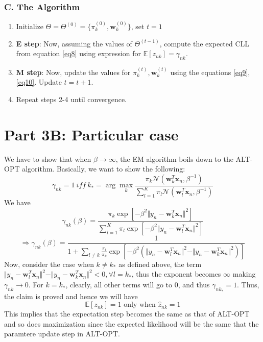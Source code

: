\documentclass[a4paper,11pt]{article}
\begin{document}
\begin{mlsolution}
\subsubsection{C. The Algorithm}
\begin{enumerate}
	\item Initialize $\Theta = \Theta^{(0)} = \{\pi^{(0)}_{k}, \textbf{w}^{(0)}_k\}$, set $t = 1$
	\item \textbf{E step}: Now, assuming the values of $\Theta^{(t-1)}$, compute the expected CLL from equation \ref{eq8} using expression for $\mathbb{E}[z_{nk}] = \gamma_{nk}$.
	\item \textbf{M step}: Now, update the values for $\pi^{(t)}_{k}, \textbf{w}_{k}^{(t)}$ using the equations \ref{eq9}, \ref{eq10}. Update $t = t+1$.
	\item Repeat steps 2-4 until convergence.
\end{enumerate}

\section{Part 3B: Particular case}
We have to show that when $\beta\rightarrow \infty$, the EM algorithm boils down to the ALT-OPT algorithm. Basically, we want to show the following:
\[
\gamma_{nk} = 1 \ \textit{iff} \ k_{*} = \arg\max_{k}\frac{\pi_k \mathcal{N}(\textbf{w}^{T}_{k}\textbf{x}_n , \beta^{-1})}{\sum_{l=1}^{K}\pi_l \mathcal{N}(\textbf{w}^{T}_{l}\textbf{x}_n , \beta^{-1})}
\]
We have 
\[
\gamma_{nk}(\beta)  =   \frac{\pi_{k}\exp\left[ -\beta^{2} \Vert y_n - \textbf{w}^{T}_{k}\textbf{x}_{n} \Vert^{2} \right]}{\sum_{l=1}^{K}\pi_{l}\exp\left[ -\beta^{2} \Vert y_n - \textbf{w}^{T}_{l}\textbf{x}_{n} \Vert^{2} \right]}
\]
\[
\Rightarrow \gamma_{nk}(\beta)  = \frac{1}{1 + \sum_{l\neq k} \frac{\pi_{l}}{\pi_{k}}\exp\left[ -\beta^{2} (\Vert y_n - \textbf{w}^{T}_{l}\textbf{x}_{n} \Vert^{2} - \Vert y_n - \textbf{w}^{T}_{k}\textbf{x}_{n} \Vert^{2}) \right]}
\]
Now, consider the case when $k \neq  k_{*}$ as defined above, the term $\Vert y_n - \textbf{w}^{T}_{l}\textbf{x}_{n} \Vert^{2} - \Vert y_n - \textbf{w}^{T}_{k}\textbf{x}_{n} \Vert^{2} < 0 , \forall l = k_{*}$, thus the exponent becomes $\infty$ making $\gamma_{nk}\rightarrow 0$. For $k = k_{*}$, clearly, all other terms will go to $0$, and thus $\gamma_{nk_{*}} = 1$. Thus, the claim is proved and hence we will have
\[
\mathbb{E}[z_{nk}] = 1 \text{ only when } \hat{z}_{nk} = 1
\]
This implies that the expectation step becomes the same as that of ALT-OPT and so does maximization since the expected likelihood will be the same that the paramtere update step in ALT-OPT.
\end{mlsolution}
\end{document}
